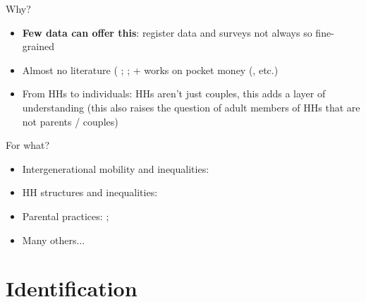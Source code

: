 \documentclass[xolor = dvipsnames, compress]{beamer} %
\begin{document}

\begin{frame}[label = why]{Why?}    
	\begin{itemize}\setlength{\itemsep}{15pt}
		\item \textbf{Few data can offer this}: register data and surveys not always so fine-grained
		\item Almost no literature (\citet{boserup_born_2018} ; \citet{sansu_2024} ;\citet{leturcq_2024} + works on pocket money (\citet{barnet-verzat_argent_2001}, etc.)
		\item From HHs to individuals: HHs aren't just couples, this adds a layer of understanding (this also raises the question of adult members of HHs that are not parents / couples)
	\end{itemize}
\end{frame}


\begin{frame}[label = for_what]{For what?}    
	\begin{itemize}\setlength{\itemsep}{15pt}
		\item Intergenerational mobility and inequalities: \citet{boserup_born_2018}
		\item HH structures and inequalities: \citet{sansu_2024}
		\item Parental practices: \citet{sansu_2024}  ; \citet{leturcq_2024}
		\item Many others...
	\end{itemize}
\end{frame}




\section{Identification}
\end{document}
